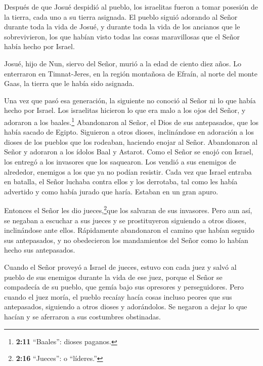  Después de que Josué despidió al pueblo, los israelitas
fueron a tomar posesión de la tierra, cada uno a su tierra asignada.
 El pueblo siguió adorando al Señor durante toda la vida de
Josué, y durante toda la vida de los ancianos que le sobrevivieron, los
que habían visto todas las cosas maravillosas que el Señor había hecho
por Israel.

 Josué, hijo de Nun, siervo del Señor, murió a la edad de
ciento diez años.  Lo enterraron en Timnat-Jeres, en la
región montañosa de Efraín, al norte del monte Gaas, la tierra que le
había sido asignada.

 Una vez que pasó esa generación, la siguiente no conoció
al Señor ni lo que había hecho por Israel.  Los israelitas
hicieron lo que era malo a los ojos del Señor, y adoraron a los
baales.\footnote{\textbf{2:11} ``Baales'': dioses paganos.}
 Abandonaron al Señor, el Dios de sus antepasados, que los
había sacado de Egipto. Siguieron a otros dioses, inclinándose en
adoración a los dioses de los pueblos que los rodeaban, haciendo enojar
al Señor.  Abandonaron al Señor y adoraron a los ídolos
Baal y Astarot.  Como el Señor se enojó con Israel, los
entregó a los invasores que los saquearon. Los vendió a sus enemigos de
alrededor, enemigos a los que ya no podían resistir.  Cada
vez que Israel entraba en batalla, el Señor luchaba contra ellos y los
derrotaba, tal como les había advertido y como había jurado que haría.
Estaban en un gran apuro.

 Entonces el Señor les dio jueces,\footnote{\textbf{2:16}
  ``Jueces'': o ``líderes.''}que los salvaran de sus invasores.
 Pero aun así, se negaban a escuchar a sus jueces y se
prostituyeron siguiendo a otros dioses, inclinándose ante ellos.
Rápidamente abandonaron el camino que habían seguido sus antepasados, y
no obedecieron los mandamientos del Señor como lo habían hecho sus
antepasados.

 Cuando el Señor proveyó a Israel de jueces, estuvo con
cada juez y salvó al pueblo de sus enemigos durante la vida de ese juez,
porque el Señor se compadecía de su pueblo, que gemía bajo sus opresores
y perseguidores.  Pero cuando el juez moría, el pueblo
recaíay hacía cosas incluso peores que sus antepasados, siguiendo a
otros dioses y adorándolos. Se negaron a dejar lo que hacían y se
aferraron a sus costumbres obstinadas.

